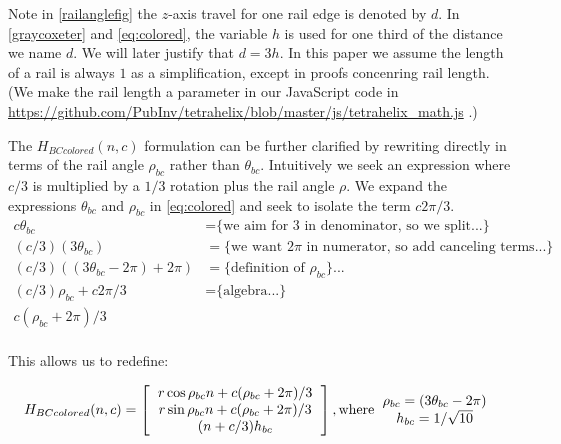 \documentclass[review]{siamonline1116}
\begin{document}
Note in \cref{railanglefig} the $z$-axis travel for one rail edge is denoted by $d$. In \eqref{graycoxeter} and \eqref{eq:colored}, the variable
$h$ is used for one third of the distance we name $d$. We will later justify that $d = 3h$.
In this paper we assume the length of a rail
is always $1$ as a simplification, except in proofs concenring rail length.
(We make the rail length a parameter in our JavaScript code in
\url{https://github.com/PubInv/tetrahelix/blob/master/js/tetrahelix_math.js} \cite{readtetrahelix}.)

The $H_{BCcolored}(n,c)$ formulation can be further clarified by rewriting directly in terms of the rail angle $\rho_{bc}$ rather than $\theta_{bc}$.
Intuitively we seek an expression where $c/3$ is multiplied by a $1/3$ rotation plus the rail angle $\rho$.
We expand 
the expressions $\theta_{bc}$ and $\rho_{bc}$ in \eqref{eq:colored} and seek to isolate the term $c2\pi/3 $.
\begin{align*}
 c \theta_{bc}  &=   \text{\{we aim for 3 in denominator, so we split...\}} \\
    (c/3)  (3 \theta_{bc})  &=   \text{\{we want $2\pi$ in numerator, so add canceling terms...\}} \\
 (c/ 3) ((3 \theta_{bc} - 2 \pi)  + 2 \pi) &= \text{\{definition of $\rho_{bc}$\}...} \\  
  (c / 3) \rho_{bc}  + c 2 \pi /3 &=  \text{\{algebra...\}} \\  
c  ( \rho_{bc} +  2 \pi) /3  \\
\end{align*}

This allows us to redefine:

\begin{equation}
H_{BCcolored}(n,c) =
\left [
  \begin{tabular}{c}
    $ r  \cos{\rho_{bc} n + c (\rho_{bc} +  2 \pi) /3} $\\
   $ r  \sin{\rho_{bc} n + c (\rho_{bc} +  2 \pi) /3} $\\
   $ (n+c/3)  h_{bc} $
  \end{tabular}
  \right ],
\text{where}
  \begin{tabular}{c}
    $\rho_{bc} = (3 \theta_{bc} - 2 \pi)$ \\
    $ h_{bc} = 1/\sqrt{10} $ \\    
  \end{tabular}      
\end{equation}
\end{document}
